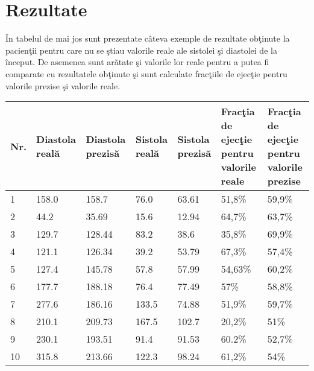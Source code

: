 \section{Rezultate}

\^{I}n tabelul de mai jos sunt prezentate c\^{a}teva exemple de rezultate ob\c{t}inute la pacien\c{t}ii pentru care nu se \c{s}tiau valorile reale ale sistolei \c{s}i diastolei de la \^{i}nceput. De asemenea sunt ar\u{a}tate \c{s}i valorile lor reale pentru a putea fi comparate cu rezultatele ob\c{t}inute \c{s}i sunt calculate frac\c{t}iile de ejec\c{t}ie pentru valorile prezise \c{s}i valorile reale.

\begin{center}
 \begin{longtable}{|p{0.5cm}|p{2cm}|p{2cm}|p{2cm}|p{2cm}|p{2cm}|p{2cm}|} 
 \hline
 Nr. & Diastola real\u{a} & Diastola prezis\u{a} & Sistola real\u{a} & Sistola prezis\u{a} & Frac\c{t}ia de ejec\c{t}ie pentru valorile reale & Frac\c{t}ia de ejec\c{t}ie pentru valorile prezise  \\ [0.5ex] 
 \hline\hline
 1 &  158.0 & 158.7 & 76.0 & 63.61 & 51,8\% & 59,9\% \\
 \hline
 2 &  44.2 & 35.69 & 15.6 & 12.94 & 64,7\% & 63,7\% \\ 
 \hline
 3 &  129.7 & 128.44 & 83.2 & 38.6 & 35,8\% & 69,9\% \\
 \hline
 4 &  121.1 & 126.34 & 39.2 & 53.79 & 67,3\% & 57,4\% \\
 \hline
 5 &  127.4 & 145.78 & 57.8 & 57.99 & 54,63\% & 60,2\% \\
 \hline
 6 &  177.7 & 188.18 & 76.4 & 77.49 & 57\% & 58,8\% \\
 \hline
 7 &  277.6 & 186.16 & 133.5 & 74.88 & 51,9\% & 59,7\% \\
 \hline
 8 &  210.1 & 209.73 & 167.5 & 102.7 & 20,2\% & 51\% \\
 \hline
 9 &  230.1 & 193.51 & 91.4 & 91.53 & 60.2\% & 52,7\% \\
 \hline
 10 &  315.8 & 213.66 & 122.3 & 98.24 & 61,2\% & 54\% \\
 \hline
\end{longtable}
\end{center}

